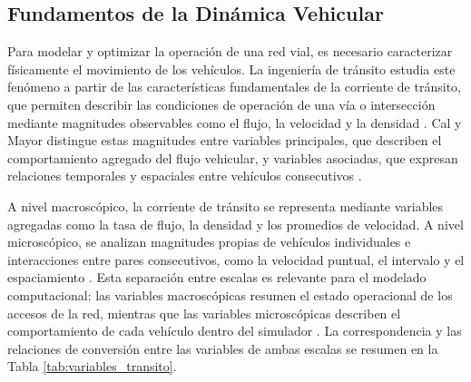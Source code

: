 \subsection{Fundamentos de la Dinámica Vehicular}\label{subsec:fundamentos_dinamica_vehicular}

Para modelar y optimizar la operación de una red vial, es necesario caracterizar físicamente el movimiento de los vehículos. La ingeniería de tránsito estudia este fenómeno a partir de las características fundamentales de la corriente de tránsito, que permiten describir las condiciones de operación de una vía o intersección mediante magnitudes observables como el flujo, la velocidad y la densidad \cite[pp.~203--204]{ite_handbook}. Cal y Mayor distingue estas magnitudes entre variables principales, que describen el comportamiento agregado del flujo vehicular, y variables asociadas, que expresan relaciones temporales y espaciales entre vehículos consecutivos \cite[p.~302]{calymayor}.

A nivel macroscópico, la corriente de tránsito se representa mediante variables agregadas como la tasa de flujo, la densidad y los promedios de velocidad. A nivel microscópico, se analizan magnitudes propias de vehículos individuales e interacciones entre pares consecutivos, como la velocidad puntual, el intervalo y el espaciamiento \cite[p.~302]{calymayor}. Esta separación entre escalas es relevante para el modelado computacional: las variables macroscópicas resumen el estado operacional de los accesos de la red, mientras que las variables microscópicas describen el comportamiento de cada vehículo dentro del simulador \cite{fernandez}. La correspondencia y las relaciones de conversión entre las variables de ambas escalas se resumen en la Tabla \ref{tab:variables_transito}.

